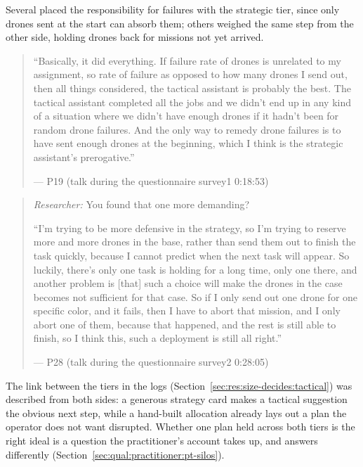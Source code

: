 
\label{sec:qual:hierarchy:cascade}
Several placed the responsibility for failures with the strategic tier, since only drones sent at the start can absorb them; others weighed the same step from the other side, holding drones back for missions not yet arrived.

\begin{quote}\small
``Basically, it did everything. If failure rate of drones is unrelated to my assignment, so rate of failure as opposed to how many drones I send out, then all things considered, the tactical assistant is probably the best. The tactical assistant completed all the jobs and we didn't end up in any kind of a situation where we didn't have enough drones if it hadn't been for random drone failures. And the only way to remedy drone failures is to have sent enough drones at the beginning, which I think is the strategic assistant's prerogative.''\par\hfill--- P19 (talk during the questionnaire survey1 0:18:53)
\end{quote}

\begin{quote}\small
{\footnotesize\textit{Researcher:} You found that one more demanding?}\par\smallskip
``I'm trying to be more defensive in the strategy, so I'm trying to reserve more and more drones in the base, rather than send them out to finish the task quickly, because I cannot predict when the next task will appear. So luckily, there's only one task is holding for a long time, only one there, and another problem is [that] such a choice will make the drones in the case becomes not sufficient for that case. So if I only send out one drone for one specific color, and it fails, then I have to abort that mission, and I only abort one of them, because that happened, and the rest is still able to finish, so I think this, such a deployment is still all right.''\par\hfill--- P28 (talk during the questionnaire survey2 0:28:05)
\end{quote}


\label{sec:qual:hierarchy:one-plan}
The link between the tiers in the logs (Section~\ref{sec:res:size-decides:tactical}) was described from both sides: a generous strategy card makes a tactical suggestion the obvious next step, while a hand-built allocation already lays out a plan the operator does not want disrupted. Whether one plan held across both tiers is the right ideal is a question the practitioner's account takes up, and answers differently (Section~\ref{sec:qual:practitioner:pt-silos}).

